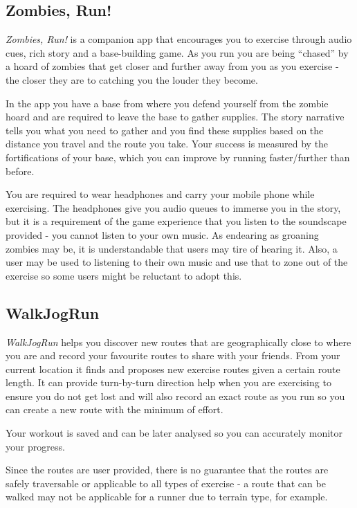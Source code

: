 \subsection{Zombies, Run!}
\label{sec:zombies}
\emph{Zombies, Run!} is a companion app that encourages you to exercise through
audio cues, rich story and a base-building game. As you run you are
being ``chased'' by a hoard of zombies that get closer and further
away from you as you exercise - the closer they are to catching you
the louder they become. 

In the app you have a base from where you defend yourself from the
zombie hoard and are required to leave the base to gather
supplies. The story narrative tells you what you need to gather and
you find these supplies based on the distance you travel and the route
you take. Your success is measured by the fortifications of your base,
which you can improve by running faster/further than before.

You are required to wear headphones and carry your mobile phone while
exercising. The headphones give you audio queues to immerse you in the
story, but it is a requirement of the game experience that you listen
to the soundscape provided - you cannot listen to your own music. As
endearing as groaning zombies may be, it is understandable that users
may tire of hearing it. Also, a user may be used to listening to their
own music and use that to zone out of the exercise so some users might
be reluctant to adopt this.


\subsection{WalkJogRun}
\label{sec:walkjogrun}
\emph{WalkJogRun} helps you discover new routes that are geographically
close to where you are and record your favourite routes to share with
your friends. From your current location it finds and
proposes new exercise routes given a certain route length. It can
provide turn-by-turn direction help when you are exercising to ensure
you do not get lost and will also record an exact route as you run so
you can create a new route with the minimum of effort. 

Your workout is saved and can be later analysed so you can accurately
monitor your progress.

Since the routes are user provided, there is no guarantee that the
routes are safely traversable or applicable to all types of exercise -
a route that can be walked may not be applicable for a runner due to
terrain type, for example. 

